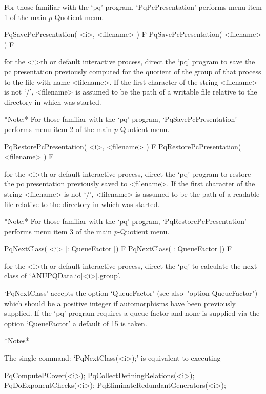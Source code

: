 For those familiar with the  `pq'  program,  `PqPcPresentation'  performs
menu item 1 of the main $p$-Quotient menu.

\>PqSavePcPresentation( <i>, <filename> ) F
\>PqSavePcPresentation( <filename> ) F

for the <i>th or default interactive {\ANUPQ} process,  direct  the  `pq'
program to save the pc presentation previously computed for  the  quotient
of the group of that process to the file with  name  <filename>.  If  the
first character of the  string  <filename>  is  not  `/',  <filename>  is
assumed to be the path of a writable file relative to  the  directory  in
which {\GAP} was started.

*Note:* For those familiar with the `pq'  program,  `PqSavePcPresentation'
performs menu item 2 of the main $p$-Quotient menu.

\>PqRestorePcPresentation( <i>, <filename> ) F
\>PqRestorePcPresentation( <filename> ) F

for the <i>th or default interactive {\ANUPQ} process,  direct  the  `pq'
program to restore the pc presentation previously saved to <filename>.  If
the first character of the string <filename> is not  `/',  <filename>  is
assumed to be the path of a readable file relative to  the  directory  in
which {\GAP} was started.

*Note:*
For  those  familiar  with  the  `pq'  program,  `PqRestorePcPresentation'
performs menu item 3 of the main $p$-Quotient menu.

\>PqNextClass( <i> [: QueueFactor ]) F
\>PqNextClass([: QueueFactor ]) F

for the <i>th or default interactive {\ANUPQ} process, direct the `pq' to
calculate the next class of `ANUPQData.io[<i>].group'.

`PqNextClass'  accepts  the  option   `QueueFactor'   (see   also~"option
QueueFactor") which should be a positive integer  if  automorphisms  have
been previously supplied. If the `pq' program requires a queue factor  and
none is supplied via the option `QueueFactor' a default of 15 is taken.

*Notes*

The single command: `PqNextClass(<i>);' is equivalent to executing

PqComputePCover(<i>);
PqCollectDefiningRelations(<i>);
PqDoExponentChecks(<i>);
PqEliminateRedundantGenerators(<i>);

